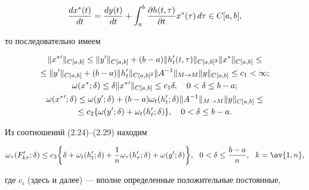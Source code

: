 \begin{equation}


\frac{dx^*(t)}{dt}=\frac{dy(t)}{dt}+\intl_a^b\frac{\partial h(t,\tau)}


{\partial t}x^*(\tau ) \, d\tau\in C[a,b],


\end{equation}


то последовательно имеем


\begin{gather}


\|x^*{}'\|_{C[a,b]}\leq \|y'\|_{C[a,b]}+(b-a)\|h'_t(t,\tau)\|_{C[a,b]^2}


\|x^*\|_{C[a,b]}\leq \notag \\


%


\leq \|y'\|_{C[a,b]}+(b-a)\|h'_t\|_{C[a,b]^2} \|A^{-1}\|_{M\rightarrow


M} \|y\|_{C[a,b]}\leq c_1<\infty ; \\


%


\omega(x^*;\delta)\leq \delta \|x^*{}'\|_{C[a,b]}\leq c_1 \delta ,\quad


0<\delta\leq b-a; \\


%


\omega(x^*{}';\delta)\leq \omega(y';\delta)+(b-a)\omega_t(h'_t;\delta)


\|A^{-1}\|_{M\rightarrow M} \|y\|_{C[a,b]}\leq\notag \\


%


\leq c_2\{ \omega(y';\delta)+\omega_t(h'_t;\delta)\},\quad


0<\delta\leq b-a.


\end{gather}


Из соотношений (2.24)--(2.29) находим


\begin{equation}


\omega_\tau(F'_{k\tau};\delta)\leq c_3\bigg\{ \delta + \omega_t(h'_t;\delta)+


\frac{1}{n}\omega_\tau(h'_\tau;\delta)+ \omega(y';\delta)\bigg\},\ \


0<\delta\leq \frac{b-a}{n},\ \ k=\ov{1,n},


\end{equation}


где $c_i$ (здесь и далее) --- вполне определенные положительные постоянные,


